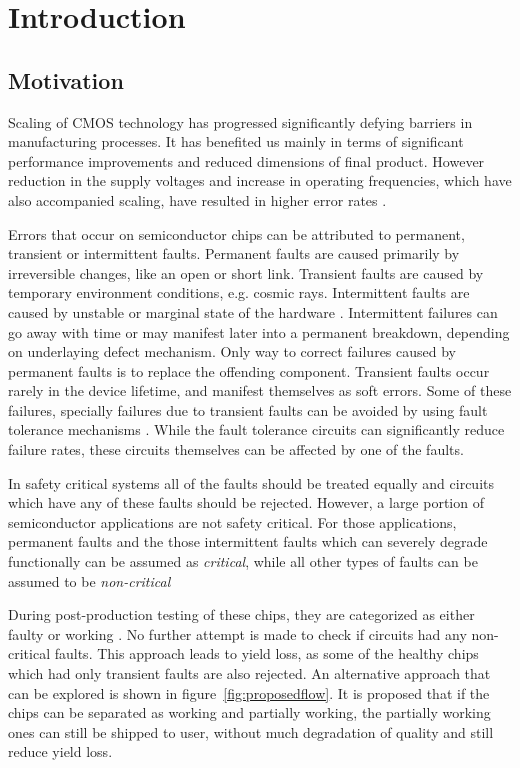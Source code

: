 \chapter{Introduction}

\section{Motivation}
Scaling of CMOS technology has progressed significantly defying barriers in manufacturing processes. It has benefited us mainly in terms of significant performance improvements and reduced dimensions of final product. However reduction in the supply voltages and increase in operating frequencies, which have also accompanied scaling, have resulted in higher error rates \cite{Srinivasan2004, Constantinescu2007, Agostinelli2005}.

Errors that occur on semiconductor chips  can be attributed to permanent, transient or intermittent faults. Permanent faults are caused primarily by irreversible changes, like an open or short link. Transient faults are caused by temporary environment conditions, e.g. cosmic rays. Intermittent faults are caused by unstable or marginal state of the hardware \cite{Constantinescu2007}. Intermittent failures can go away with time or may manifest later into a permanent breakdown, depending on underlaying defect mechanism. Only way to correct failures caused by permanent faults is to replace the offending component.  Transient faults occur rarely in the device lifetime, and manifest themselves as soft errors. Some of these failures, specially  failures due to transient faults can be avoided by using fault tolerance mechanisms \cite{Bartlett2004, Mitra2008}. While the fault tolerance circuits can significantly reduce failure rates, these circuits themselves can be affected by one of the faults.

In safety critical systems all of the faults should be treated equally and circuits which have any of these faults should be rejected. However, a large portion of semiconductor applications are not safety critical. For those applications, permanent faults and the those intermittent faults which can severely degrade functionally can be assumed as \emph{critical}, while all other types of faults can be assumed to be \emph{non-critical}

During post-production testing of these chips, they are categorized as either faulty or working \cite{Agrawal2000}. No further attempt is made to check if circuits had any non-critical faults. This approach leads to yield loss, as some of the healthy chips which had only transient faults are also rejected. An alternative approach that can be explored is shown in figure~\ref{fig:proposedflow}. It is proposed that if the chips can be separated as working and partially working, the partially working ones can still be shipped to user, without much degradation of quality and still reduce yield loss.

